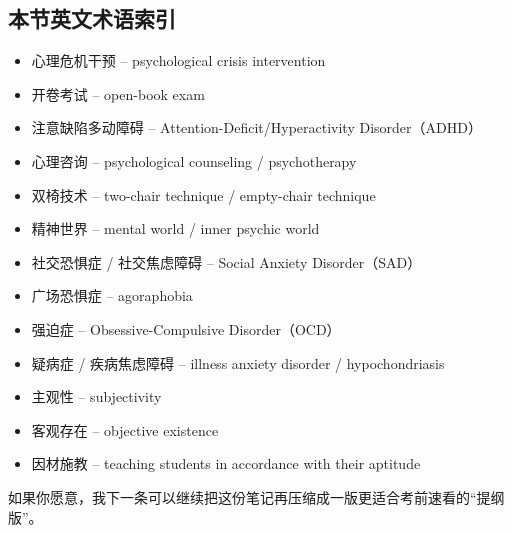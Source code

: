 \documentclass[
  chinese,
  9pt,
  a4paper,
]{ctexart}
\providecommand{\tightlist}{%
  \setlength{\itemsep}{0pt}\setlength{\parskip}{0pt}}
\begin{document}
\subsection{本节英文术语索引}\label{ux672cux8282ux82f1ux6587ux672fux8bedux7d22ux5f15-6}

\begin{itemize}
\tightlist
\item
  心理危机干预 -- psychological crisis intervention
\item
  开卷考试 -- open-book exam
\item
  注意缺陷多动障碍 -- Attention-Deficit/Hyperactivity Disorder（ADHD）
\item
  心理咨询 -- psychological counseling / psychotherapy
\item
  双椅技术 -- two-chair technique / empty-chair technique
\item
  精神世界 -- mental world / inner psychic world
\item
  社交恐惧症 / 社交焦虑障碍 -- Social Anxiety Disorder（SAD）
\item
  广场恐惧症 -- agoraphobia
\item
  强迫症 -- Obsessive-Compulsive Disorder（OCD）
\item
  疑病症 / 疾病焦虑障碍 -- illness anxiety disorder / hypochondriasis
\item
  主观性 -- subjectivity
\item
  客观存在 -- objective existence
\item
  因材施教 -- teaching students in accordance with their aptitude
\end{itemize}

如果你愿意，我下一条可以继续把这份笔记再压缩成一版更适合考前速看的``提纲版''。
\end{document}

